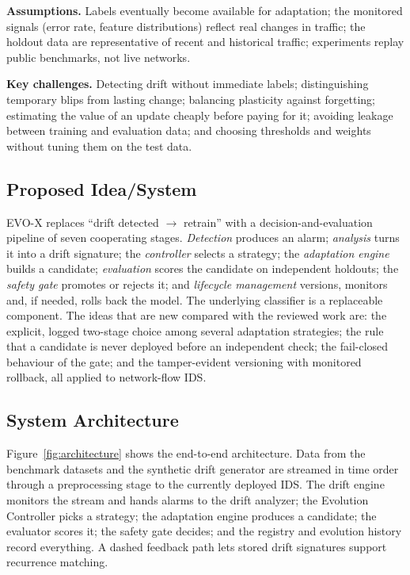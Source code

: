\documentclass{article}
\begin{document}
\textbf{Assumptions.} Labels eventually become available for adaptation; the monitored signals (error rate, feature distributions) reflect real changes in traffic; the holdout data are representative of recent and historical traffic; experiments replay public benchmarks, not live networks.

\textbf{Key challenges.} Detecting drift without immediate labels; distinguishing temporary blips from lasting change; balancing plasticity against forgetting; estimating the value of an update cheaply before paying for it; avoiding leakage between training and evaluation data; and choosing thresholds and weights without tuning them on the test data.

	\subsection{Proposed Idea/System}

EVO-X replaces ``drift detected $\rightarrow$ retrain'' with a decision-and-evaluation pipeline of seven cooperating stages. \emph{Detection} produces an alarm; \emph{analysis} turns it into a drift signature; the \emph{controller} selects a strategy; the \emph{adaptation engine} builds a candidate; \emph{evaluation} scores the candidate on independent holdouts; the \emph{safety gate} promotes or rejects it; and \emph{lifecycle management} versions, monitors and, if needed, rolls back the model. The underlying classifier is a replaceable component. The ideas that are new compared with the reviewed work are: the explicit, logged two-stage choice among several adaptation strategies; the rule that a candidate is never deployed before an independent check; the fail-closed behaviour of the gate; and the tamper-evident versioning with monitored rollback, all applied to network-flow IDS.

	\subsection{System Architecture}

Figure~\ref{fig:architecture} shows the end-to-end architecture. Data from the benchmark datasets and the synthetic drift generator are streamed in time order through a preprocessing stage to the currently deployed IDS. The drift engine monitors the stream and hands alarms to the drift analyzer; the Evolution Controller picks a strategy; the adaptation engine produces a candidate; the evaluator scores it; the safety gate decides; and the registry and evolution history record everything. A dashed feedback path lets stored drift signatures support recurrence matching.
\end{document}
